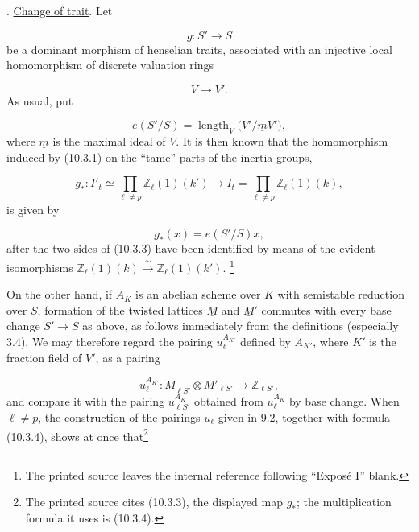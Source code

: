 
\medskip
{}. \underline{Change of trait}. Let

\begin{equation}\tag{10.3.1}
g:S'\longrightarrow S
\end{equation}
be a dominant morphism of henselian traits, associated with an injective
local homomorphism of discrete valuation rings

\begin{equation*}
V\longrightarrow V'.
\end{equation*}
As usual, put

\begin{equation}\tag{10.3.2}
e(S'/S)=\operatorname{length}_V\bigl(V'/\underline mV'\bigr),
\end{equation}
where $\underline m$ is the maximal ideal of $V$. It is then known that
the homomorphism induced by (10.3.1) on the ``tame'' parts of the inertia
groups,

\begin{equation}\tag{10.3.3}
g_*:I'_t\simeq\prod_{\ell\ne p}\mathbb Z_\ell(1)(k')
 \longrightarrow
 I_t=\prod_{\ell\ne p}\mathbb Z_\ell(1)(k),
\end{equation}
is given by

\begin{equation}\tag{10.3.4}
g_*(x)=e(S'/S)x,
\end{equation}
after the two sides of (10.3.3) have been identified by means of the
evident isomorphisms
$\mathbb Z_\ell(1)(k)\xrightarrow{\ \sim\ }\mathbb Z_\ell(1)(k')$.
\footnote{The printed source leaves the internal reference following
``Expos\'e I'' blank.}

On the other hand, if $A_K$ is an abelian scheme over $K$ with
semistable reduction over $S$, formation of the twisted lattices
$\underline M$ and $\underline M'$ commutes with every base change
$S'\longrightarrow S$ as above, as follows immediately from the
definitions (especially 3.4). We may therefore regard the pairing
$u_\ell^{A_{K'}}$ defined by $A_{K'}$, where $K'$ is the fraction field
of $V'$, as a pairing

\begin{equation*}
u_\ell^{A_{K'}}:
 \underline M_{\ell S'}\otimes\underline M'_{\ell S'}
 \longrightarrow\mathbb Z_{\ell S'},
\end{equation*}
and compare it with the pairing $u_{\ell S'}^{A_K}$ obtained from
$u_\ell^{A_K}$ by base change. When $\ell\ne p$, the construction of the
pairings $u_\ell$ given in 9.2, together with formula (10.3.4), shows at
once that\footnote{The printed source cites (10.3.3), the displayed map
$g_*$; the multiplication formula it uses is (10.3.4).}

